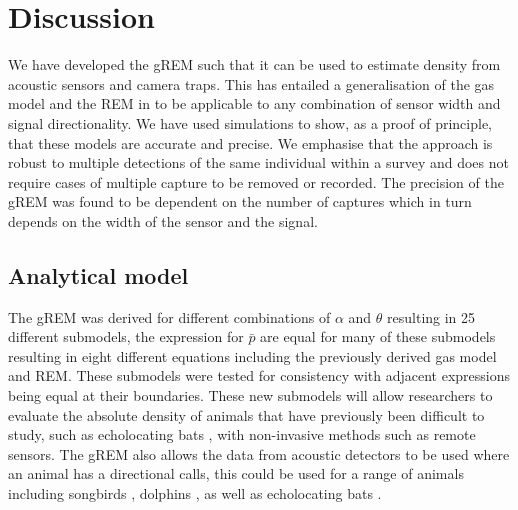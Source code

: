 \documentclass[a4paper,10pt,reqno,oneside]{amsart}
\begin{document}
                  
                  
\section*{Discussion}

We have developed the gREM such that it can be used to estimate density from acoustic sensors and camera traps. This has entailed a generalisation of the gas model and the REM in \citet{rowcliffe2008estimating} to be applicable to any combination of sensor width and signal directionality. We have used simulations to show, as a proof of principle, that these models are accurate and precise. We emphasise that the approach is robust to multiple detections of the same individual within a survey and does not require cases of multiple capture to be removed or recorded. The precision of the gREM was found to be dependent on the number of captures which in turn depends on the width of the sensor and the signal.

\subsection*{Analytical model}
The gREM was derived for different combinations of $\alpha$ and $\theta$ resulting in 25 different submodels, the expression for $\bar{p}$ are equal for many of these submodels resulting in eight different equations including the previously derived gas model and REM. These submodels were tested for consistency with adjacent expressions being equal at their boundaries. These new submodels will allow researchers to evaluate the absolute density of animals that have previously been difficult to study, such as echolocating bats \citep{clement2013estimating}, with non-invasive methods such as remote sensors. The gREM also allows the data from acoustic detectors to be used where an animal has a directional calls, this could be used for a range of animals including songbirds \citep{blumstein2011acoustic}, dolphins \citep{lammers2003directionality}, as well as echolocating bats \citep{walters2013challenges}. 
\end{document}
